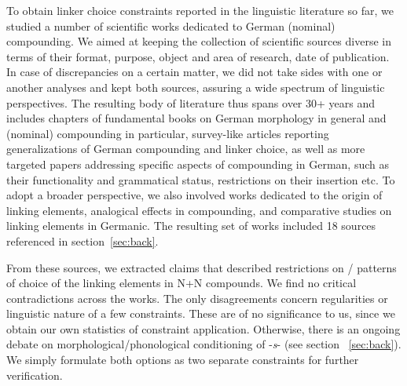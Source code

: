 \documentclass[10pt, a4paper]{article}
\begin{document}
To obtain linker choice constraints reported in the linguistic literature so far, we studied a number of scientific works dedicated to German (nominal) compounding. We aimed at keeping the collection of scientific sources diverse in terms of their format, purpose, object and area of research, date of publication. In case of discrepancies on a certain matter, we did not take sides with one or another analyses and kept both sources, assuring a wide spectrum of linguistic perspectives. The resulting body of literature thus spans over 30+ years and includes chapters of fundamental books on German morphology in general and (nominal) compounding in particular, survey-like articles reporting generalizations of German compounding and linker choice, as well as more targeted papers addressing specific aspects of compounding in German, such as their functionality and grammatical status, restrictions on their insertion etc. To adopt a broader perspective, we also involved works dedicated to the origin of linking elements, analogical effects in compounding, and comparative studies on linking elements in Germanic. The resulting set of works included 18 sources referenced in section~\ref{sec:back}.

From these sources, we extracted claims that described restrictions on / patterns of choice of the linking elements in N+N compounds. We find no critical contradictions across the works. The only disagreements concern regularities or linguistic nature of a few constraints. These are of no significance to us, since we obtain our own statistics of constraint application. Otherwise, there is an ongoing debate on morphological/phonological conditioning of -\textit{s}- (see section ~\ref{sec:back}). We simply formulate both options as two separate constraints for further verification.

\end{document}
